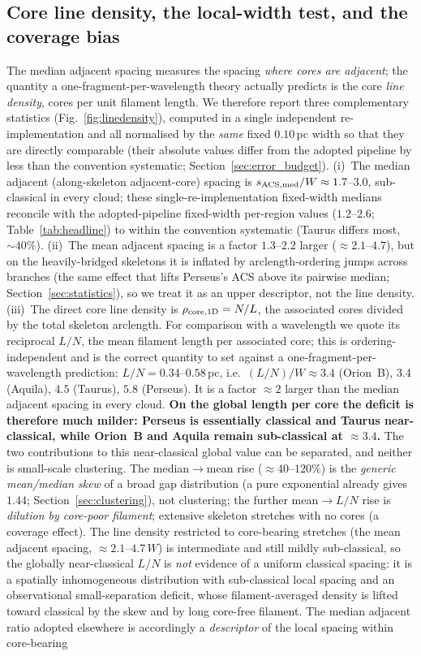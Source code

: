 \documentclass[usenatbib,twoside,twocolumn]{mnras}
\begin{document}
\subsection{Core line density, the local-width test, and the coverage bias}
\label{sec:linedensity}
The median adjacent spacing measures the spacing \emph{where cores are adjacent}; the quantity a one-fragment-per-wavelength theory actually predicts is the core \emph{line density}, cores per unit filament length. We therefore report three complementary statistics (Fig.~\ref{fig:linedensity}), computed in a single independent re-implementation and all normalised by the \emph{same} fixed $0.10$\,pc width so that they are directly comparable (their absolute values differ from the adopted pipeline by less than the convention systematic; Section~\ref{sec:error_budget}). (i)~The median adjacent (along-skeleton adjacent-core) spacing is $s_{\rm ACS,med}/W\approx1.7$--$3.0$, sub-classical in every cloud; these single-re-implementation fixed-width medians reconcile with the adopted-pipeline fixed-width per-region values ($1.2$--$2.6$; Table~\ref{tab:headline}) to within the convention systematic (Taurus differs most, $\sim40\%$). (ii)~The mean adjacent spacing is a factor $1.3$--$2.2$ larger ($\approx2.1$--$4.7$), but on the heavily-bridged skeletons it is inflated by arclength-ordering jumps across branches (the same effect that lifts Perseus's ACS above its pairwise median; Section~\ref{sec:statistics}), so we treat it as an upper descriptor, not the line density. (iii)~The direct core line density is $\rho_{\rm core,1D}=N/L$, the associated cores divided by the total skeleton arclength. For comparison with a wavelength we quote its reciprocal $L/N$, the mean filament length per associated core; this is ordering-independent and is the correct quantity to set against a one-fragment-per-wavelength prediction: $L/N=0.34$--$0.58$\,pc, i.e.\ $(L/N)/W\approx3.4$ (Orion~B), $3.4$ (Aquila), $4.5$ (Taurus), $5.8$ (Perseus). It is a factor $\approx2$ larger than the median adjacent spacing in every cloud. \textbf{On the global length per core the deficit is therefore much milder: Perseus is essentially classical and Taurus near-classical, while Orion~B and Aquila remain sub-classical at $\approx3.4$.} The two contributions to this near-classical global value can be separated, and neither is small-scale clustering. The median$\to$mean rise ($\approx40$--$120\%$) is the \emph{generic mean/median skew} of a broad gap distribution (a pure exponential already gives $1.44$; Section~\ref{sec:clustering}), not clustering; the further mean$\to L/N$ rise is \emph{dilution by core-poor filament}; extensive skeleton stretches with no cores (a coverage effect). The line density restricted to core-bearing stretches (the mean adjacent spacing, $\approx2.1$--$4.7\,W$) is intermediate and still mildly sub-classical, so the globally near-classical $L/N$ is \emph{not} evidence of a uniform classical spacing: it is a spatially inhomogeneous distribution with sub-classical local spacing and an observational small-separation deficit, whose filament-averaged density is lifted toward classical by the skew and by long core-free filament. The median adjacent ratio adopted elsewhere is accordingly a \emph{descriptor} of the local spacing within core-bearing 
\end{document}
